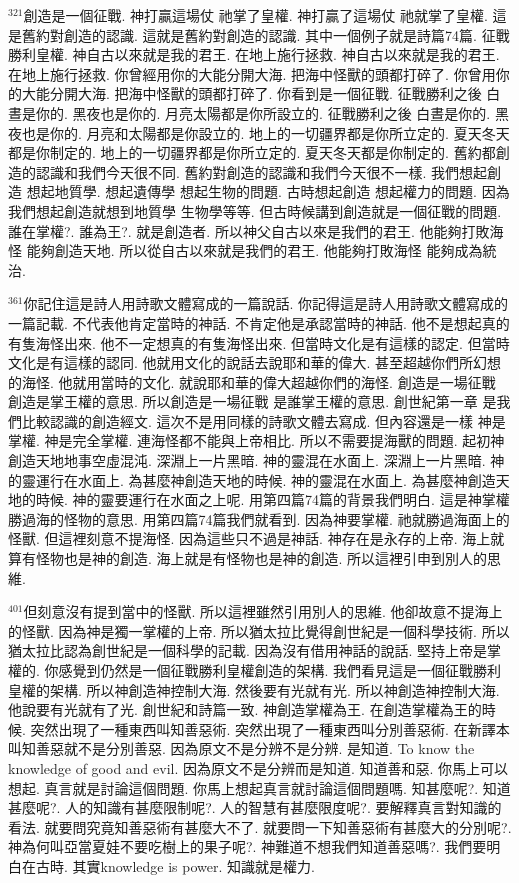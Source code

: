 \documentclass{book}
\begin{document}
$^{321}$創造是一個征戰.
神打贏這場仗 祂掌了皇權.
神打贏了這場仗 祂就掌了皇權.
這是舊約對創造的認識.
這就是舊約對創造的認識.
其中一個例子就是詩篇74篇.
征戰勝利皇權.
神自古以來就是我的君王.
在地上施行拯救.
神自古以來就是我的君王.
在地上施行拯救.
你曾經用你的大能分開大海.
把海中怪獸的頭都打碎了.
你曾用你的大能分開大海.
把海中怪獸的頭都打碎了.
你看到是一個征戰.
征戰勝利之後 白晝是你的.
黑夜也是你的.
月亮太陽都是你所設立的.
征戰勝利之後 白晝是你的.
黑夜也是你的.
月亮和太陽都是你設立的.
地上的一切疆界都是你所立定的.
夏天冬天都是你制定的.
地上的一切疆界都是你所立定的.
夏天冬天都是你制定的.
舊約都創造的認識和我們今天很不同.
舊約對創造的認識和我們今天很不一樣.
我們想起創造 想起地質學.
想起遺傳學 想起生物的問題.
古時想起創造 想起權力的問題.
因為我們想起創造就想到地質學 生物學等等.
但古時候講到創造就是一個征戰的問題.
誰在掌權?.
誰為王?.
就是創造者.
所以神父自古以來是我們的君王.
他能夠打敗海怪 能夠創造天地.
所以從自古以來就是我們的君王.
他能夠打敗海怪 能夠成為統治.

$^{361}$你記住這是詩人用詩歌文體寫成的一篇說話.
你記得這是詩人用詩歌文體寫成的一篇記載.
不代表他肯定當時的神話.
不肯定他是承認當時的神話.
他不是想起真的有隻海怪出來.
他不一定想真的有隻海怪出來.
但當時文化是有這樣的認定.
但當時文化是有這樣的認同.
他就用文化的說話去說耶和華的偉大.
甚至超越你們所幻想的海怪.
他就用當時的文化.
就說耶和華的偉大超越你們的海怪.
創造是一場征戰 創造是掌王權的意思.
所以創造是一場征戰 是誰掌王權的意思.
創世紀第一章 是我們比較認識的創造經文.
這次不是用同樣的詩歌文體去寫成.
但內容還是一樣 神是掌權.
神是完全掌權.
連海怪都不能與上帝相比.
所以不需要提海獸的問題.
起初神創造天地地事空虛混沌.
深淵上一片黑暗.
神的靈混在水面上.
深淵上一片黑暗.
神的靈運行在水面上.
為甚麼神創造天地的時候.
神的靈混在水面上.
為甚麼神創造天地的時候.
神的靈要運行在水面之上呢.
用第四篇74篇的背景我們明白.
這是神掌權勝過海的怪物的意思.
用第四篇74篇我們就看到.
因為神要掌權.
祂就勝過海面上的怪獸.
但這裡刻意不提海怪.
因為這些只不過是神話.
神存在是永存的上帝.
海上就算有怪物也是神的創造.
海上就是有怪物也是神的創造.
所以這裡引申到別人的思維.

$^{401}$但刻意沒有提到當中的怪獸.
所以這裡雖然引用別人的思維.
他卻故意不提海上的怪獸.
因為神是獨一掌權的上帝.
所以猶太拉比覺得創世紀是一個科學技術.
所以猶太拉比認為創世紀是一個科學的記載.
因為沒有借用神話的說話.
堅持上帝是掌權的.
你感覺到仍然是一個征戰勝利皇權創造的架構.
我們看見這是一個征戰勝利皇權的架構.
所以神創造神控制大海.
然後要有光就有光.
所以神創造神控制大海.
他說要有光就有了光.
創世紀和詩篇一致.
神創造掌權為王.
在創造掌權為王的時候.
突然出現了一種東西叫知善惡術.
突然出現了一種東西叫分別善惡術.
在新譯本叫知善惡就不是分別善惡.
因為原文不是分辨不是分辨.
是知道.
To know the knowledge of good and evil.
因為原文不是分辨而是知道.
知道善和惡.
你馬上可以想起.
真言就是討論這個問題.
你馬上想起真言就討論這個問題嗎.
知甚麼呢?.
知道甚麼呢?.
人的知識有甚麼限制呢?.
人的智慧有甚麼限度呢?.
要解釋真言對知識的看法.
就要問究竟知善惡術有甚麼大不了.
就要問一下知善惡術有甚麼大的分別呢?.
神為何叫亞當夏娃不要吃樹上的果子呢?.
神難道不想我們知道善惡嗎?.
我們要明白在古時.
其實knowledge is power.
知識就是權力.
\end{document}
